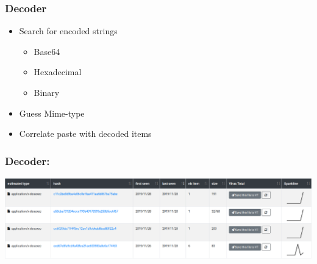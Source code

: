 \documentclass{beamer}
\begin{document}
\begin{frame}
    \frametitle{Decoder}
    \begin{itemize}
    	\item Search for encoded strings
    		\begin{itemize}
				\item Base64
				\item Hexadecimal
				\item Binary
			\end{itemize}
    	\item Guess Mime-type
    	\item Correlate paste with decoded items
    \end{itemize}
\end{frame}


\begin{frame}
    \frametitle{Decoder:}
    \centerline{
        \includegraphics[scale=0.23]{images/decoded-dos.png}
    }
\end{frame}
\end{document}
